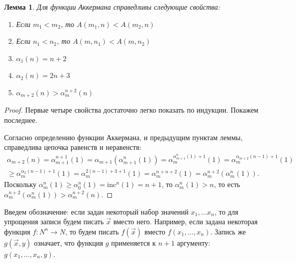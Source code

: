 \documentclass[a4paper,11pt]{article}
\newtheorem{lmm}[thm]{Лемма}
\theoremstyle{definition}
\newcommand{\vect}[1]{\overrightarrow{#1}}
\begin{document}
\begin{lmm}\label{lmm:ackermann}
Для функции Аккермана справедливы следующие свойства:
\begin{enumerate}
\item Если $m_1 < m_2$, то $A(m_1, n) < A(m_2, n)$
\item Если $n_1 < n_2$, то $A(m, n_1) < A(m, n_2)$
\item $\alpha_1(n) = n + 2$
\item $\alpha_2(n) = 2n + 3$
\item $\alpha_{m+2}(n) > \alpha_m^{n+2}(n)$
\end{enumerate}
\end{lmm}
\begin{proof}
Первые четыре свойства достаточно легко показать по индукции. Покажем
последнее.

Согласно определению функции Аккермана, и предыдущим пунктам леммы, справедлива
цепочка равенств и неравенств:
\begin{multline*}
\alpha_{m+2}(n) = \alpha_{m+1}^{n+1}(1) = \alpha_{m+1}(\alpha_{m+1}^n(1))
= \alpha_m^{\alpha_{m+1}^n(1)+1}(1) = \alpha_m^{\alpha_{m+2}(n-1)+1}(1)\\
\ge \alpha_m^{\alpha_2(n-1)+1}(1) = \alpha_m^{2(n-1)+3+1}(1)
= \alpha_m^{n+n+2}(1) = \alpha_m^{n+2}(\alpha_m^n(1)).
\end{multline*}
Поскольку $\alpha_m^n(1) \ge \alpha_0^n(1) = \mathrm{inc}^n(1) = n+1$, то
$\alpha_m^n(1) > n$, то есть $\alpha_m^{n+2}(\alpha_m^n(1)) > \alpha_m^{n+2}(n)$.
\end{proof}

Введем обозначение: если задан некоторый набор значений $x_1, \dots x_n$, то
для упрощения записи будем писать $\vect{x}$ вместо него. Например, если задана
некоторая функция $f : N^n \to N$, то будем писать $f(\vect{x})$ вместо $f(x_1,
\dots, x_n)$. Запись же $g(\vect{x}, y)$ означает, что функция $g$ применяется к
$n+1$ аргументу: $g(x_1, \dots, x_n, y)$.
\end{document}
